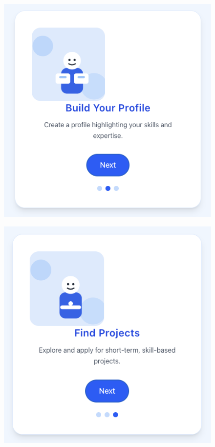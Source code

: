 \begin{figure}[h]
\begin{minipage}[b]{0.3\linewidth}
    \includegraphics[width=\linewidth]{figures/Onboarding-2.png}
  \end{minipage}\hfill
  \begin{minipage}[b]{0.3\linewidth}
    \includegraphics[width=\linewidth]{figures/Onboarding-3.png}\\[0.3em]

\end{minipage}
\end{figure}
